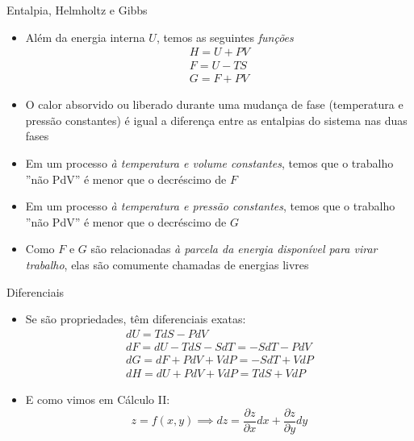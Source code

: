 \begin{frame}{Entalpia, Helmholtz e Gibbs}
    \begin{itemize}
        \item Além da energia interna \(U\), temos as seguintes \textit{funções}
            \begin{gather*}
                H=U+PV \\
                F=U-TS \\
                G=F+PV
            \end{gather*}
        \item O calor absorvido ou liberado durante uma mudança de fase (temperatura 
            e pressão constantes) é igual a diferença entre as entalpias do sistema
            nas duas fases
        \item Em um processo \textit{à temperatura e volume constantes}, temos que o 
            trabalho ''não PdV'' é menor que o decréscimo de \(F\)
        \item Em um processo \textit{à temperatura e pressão constantes}, temos que o 
            trabalho ''não PdV'' é menor que o decréscimo de \(G\)
        \item Como \(F\) e \(G\) são relacionadas \textit{à parcela da energia disponível para virar trabalho},
            elas são comumente chamadas de energias livres
    \end{itemize}
\end{frame}

\begin{frame}{Diferenciais}
    \begin{itemize}
        \item Se são propriedades, têm diferenciais exatas:
            \begin{gather*}
                dU = TdS - PdV \\
                dF = dU - TdS - SdT = -SdT - PdV \\
                dG= dF + PdV + VdP = -SdT + VdP \\
                dH = dU + PdV + VdP = TdS + VdP
            \end{gather*}
        \item E como vimos em Cálculo II:
            \[
                z=f(x,y) \implies dz = \frac{\partial z}{\partial x} dx + \frac{\partial z}{\partial y} dy
            \]
    \end{itemize}
\end{frame}

